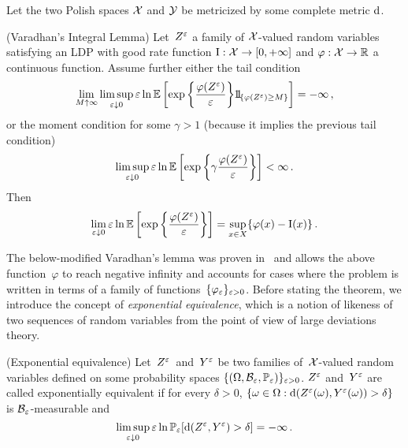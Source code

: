 Let the two Polish spaces $\mathcal{X}$ and $\mathcal{Y}$ be metricized by some complete metric $\mathrm{d}$.
\begin{theorem} (Varadhan's Integral Lemma)\label{thm:varadhan} %
Let~$Z^{\varepsilon}$ a family of $\mathcal{X}$-valued random variables satisfying an LDP with good rate function $\mathrm{I}:\mathcal{X}\to [0,+\infty]$ and $\varphi: \mathcal{X} \to \mathbb{R}$ a continuous function. 
Assume further either the tail condition
$$
\lim\limits_{M\uparrow \infty} \limsup_{\eps \downarrow 0}
\eps\ln \EE\left[\exp\left\{\frac{\varphi(Z^{\eps})}{\eps}\right\}\ind_{ \{ \varphi(Z^{\eps}) \geq M\}}\right]  = -\infty\,,
$$
or the moment condition for some $\gamma > 1$ (because it implies the previous tail condition)
$$
\limsup\limits_{\varepsilon \downarrow 0}
\varepsilon\ln \mathbb{E}\left[\exp\left\{\gamma \frac{\varphi(Z^{\varepsilon})}{\varepsilon}\right\}\right]
< \infty\,.
$$
Then
$$
\lim_{\varepsilon \downarrow 0}
\varepsilon\ln \mathbb{E}\left[\exp\left\{\frac{\varphi(Z^{\varepsilon})}{\varepsilon}\right\}\right]
= \sup\limits_{x \in X} \{\varphi(x) - \mathrm{I}(x) \}\,.
$$
\end{theorem}

The below-modified Varadhan's lemma was proven in~\cite{Robertson2010SampleModels} and allows the above function~$\varphi$ to reach negative infinity and accounts for cases where the problem is written in terms of a family of functions~$\{\varphi_{\varepsilon}\}_{\varepsilon>0}$. Before stating the theorem, we introduce the concept of \emph{exponential equivalence}, which is a notion of likeness of two sequences of random variables from the point of view of large deviations theory.
\begin{definition} (Exponential equivalence)\label{def:exponential_equivalence}  %
Let~$Z^{\varepsilon}$~and~$Y^\varepsilon$ be two families of~$\mathcal{X}$\nobreakdash-valued random variables defined on some probability spaces $\{ (\Omega,\mathcal{B}_{\varepsilon},\mathbb{P}_\varepsilon)\}_{\varepsilon>0}$. $Z^{\varepsilon}$ and~$Y^\varepsilon$ are called exponentially equivalent if for every $\delta > 0$,
$\{\omega\in\Omega: \mathrm{d}(Z^{\varepsilon}(\omega),Y^\varepsilon(\omega)) > \delta\}$ is $\mathcal{B}_\varepsilon$-measurable
and 
$$
\limsup\limits_{\varepsilon \downarrow 0} \varepsilon\ln\mathbb{P}_\varepsilon[\mathrm{d}(Z^{\varepsilon},Y^\varepsilon) > \delta] = - \infty\,.
$$
\end{definition}

